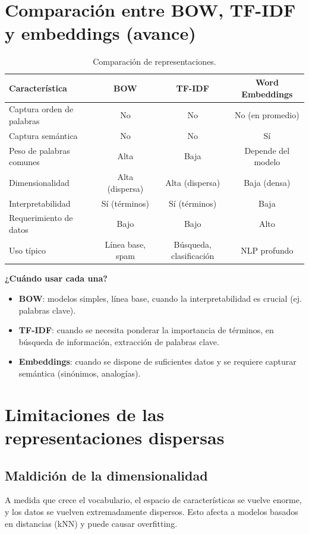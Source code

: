 \documentclass[12pt,a4paper,openany,oneside]{book}
\begin{document}
\section{Comparación entre BOW, TF-IDF y embeddings (avance)}

\begin{table}[h]
\centering
\begin{tabular}{|l|c|c|c|}
\hline
\textbf{Característica} & \textbf{BOW} & \textbf{TF-IDF} & \textbf{Word Embeddings} \\
\hline
Captura orden de palabras & No & No & No (en promedio) \\
Captura semántica & No & No & Sí \\
Peso de palabras comunes & Alta & Baja & Depende del modelo \\
Dimensionalidad & Alta (dispersa) & Alta (dispersa) & Baja (densa) \\
Interpretabilidad & Sí (términos) & Sí (términos) & Baja \\
Requerimiento de datos & Bajo & Bajo & Alto \\
Uso típico & Línea base, spam & Búsqueda, clasificación & NLP profundo \\
\hline
\end{tabular}
\caption{Comparación de representaciones.}
\end{table}

\textbf{¿Cuándo usar cada una?}
\begin{itemize}
    \item \textbf{BOW}: modelos simples, línea base, cuando la interpretabilidad es crucial (ej. palabras clave).
    \item \textbf{TF-IDF}: cuando se necesita ponderar la importancia de términos, en búsqueda de información, extracción de palabras clave.
    \item \textbf{Embeddings}: cuando se dispone de suficientes datos y se requiere capturar semántica (sinónimos, analogías).
\end{itemize}

\section{Limitaciones de las representaciones dispersas}

\subsection{Maldición de la dimensionalidad}
A medida que crece el vocabulario, el espacio de características se vuelve enorme, y los datos se vuelven extremadamente dispersos. Esto afecta a modelos basados en distancias (kNN) y puede causar overfitting.
\end{document}
